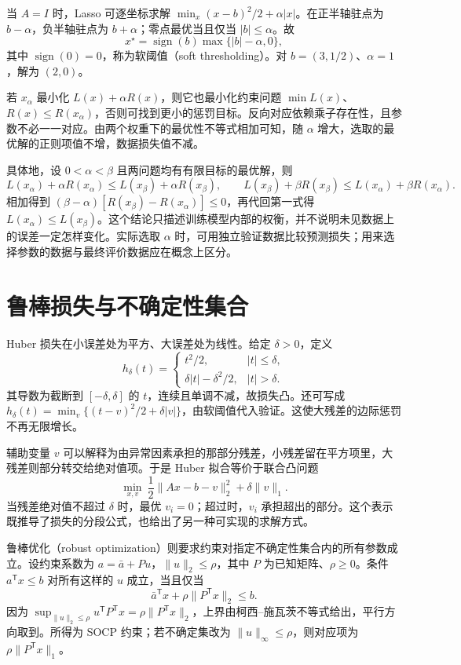 \begin{example}[软阈值]
当 $A=I$ 时，Lasso 可逐坐标求解 $\min_x(x-b)^2/2+\alpha|x|$。在正半轴驻点为 $b-\alpha$，负半轴驻点为 $b+\alpha$；零点最优当且仅当 $|b|\leq\alpha$。故
\[
 x^\star=\operatorname{sign}(b)\max\{|b|-\alpha,0\},
\]
其中 $\operatorname{sign}(0)=0$，称为软阈值（soft thresholding）。对 $b=(3,1/2)$、$\alpha=1$，解为 $(2,0)$。
\end{example}

若 $x_\alpha$ 最小化 $L(x)+\alpha R(x)$，则它也最小化约束问题 $\min L(x)$、$R(x)\leq R(x_\alpha)$，否则可找到更小的惩罚目标。反向对应依赖乘子存在性，且参数不必一一对应。由两个权重下的最优性不等式相加可知，随 $\alpha$ 增大，选取的最优解的正则项值不增，数据损失值不减。

具体地，设 $0<\alpha<\beta$ 且两问题均有有限目标的最优解，则
\[
 L(x_\alpha)+\alpha R(x_\alpha)\leq L(x_\beta)+\alpha R(x_\beta),
 \qquad
 L(x_\beta)+\beta R(x_\beta)\leq L(x_\alpha)+\beta R(x_\alpha).
\]
相加得到 $(\beta-\alpha)[R(x_\beta)-R(x_\alpha)]\leq0$，再代回第一式得 $L(x_\alpha)\leq L(x_\beta)$。这个结论只描述训练模型内部的权衡，并不说明未见数据上的误差一定怎样变化。实际选取 $\alpha$ 时，可用独立验证数据比较预测损失；用来选择参数的数据与最终评价数据应在概念上区分。

\section{鲁棒损失与不确定性集合}

Huber 损失在小误差处为平方、大误差处为线性。给定 $\delta>0$，定义
\[
 h_\delta(t)=
 \begin{cases}t^2/2,&|t|\leq\delta,\\
 \delta|t|-\delta^2/2,&|t|>\delta.
 \end{cases}
\]
其导数为截断到 $[-\delta,\delta]$ 的 $t$，连续且单调不减，故损失凸。还可写成 $h_\delta(t)=\min_v\{(t-v)^2/2+\delta|v|\}$，由软阈值代入验证。这使大残差的边际惩罚不再无限增长。

辅助变量 $v$ 可以解释为由异常因素承担的那部分残差，小残差留在平方项里，大残差则部分转交给绝对值项。于是 Huber 拟合等价于联合凸问题
\[
 \min_{x,v}\ \frac12\|Ax-b-v\|_2^2+\delta\|v\|_1.
\]
当残差绝对值不超过 $\delta$ 时，最优 $v_i=0$；超过时，$v_i$ 承担超出的部分。这个表示既推导了损失的分段公式，也给出了另一种可实现的求解方式。

鲁棒优化（robust optimization）则要求约束对指定不确定性集合内的所有参数成立。设约束系数为 $a=\bar a+Pu$，$\|u\|_2\leq\rho$，其中 $P$ 为已知矩阵、$\rho\geq0$。条件 $a^{\mathsf T}x\leq b$ 对所有这样的 $u$ 成立，当且仅当
\[
 \bar a^{\mathsf T}x+\rho\|P^{\mathsf T}x\|_2\leq b.
\]
因为 $\sup_{\|u\|_2\leq\rho}u^{\mathsf T}P^{\mathsf T}x=\rho\|P^{\mathsf T}x\|_2$，上界由柯西--施瓦茨不等式给出，平行方向取到。所得为 SOCP 约束；若不确定集改为 $\|u\|_\infty\leq\rho$，则对应项为 $\rho\|P^{\mathsf T}x\|_1$。

